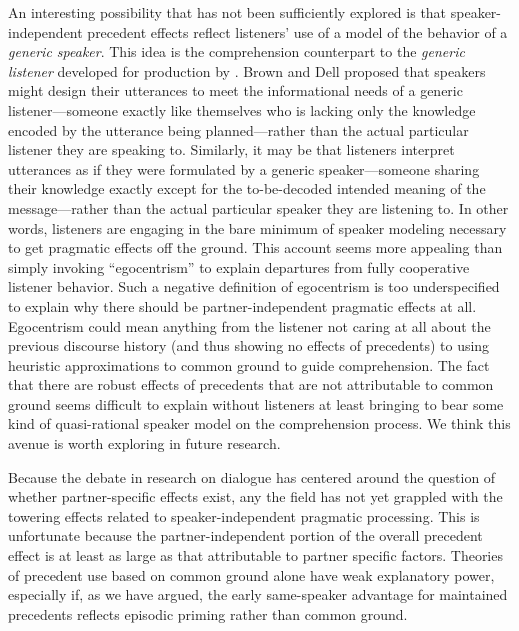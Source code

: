 \documentclass[doc,fignum,apacite,floatsintext]{apa6}
\begin{document}
An interesting possibility that has not been sufficiently explored is that speaker-independent precedent effects reflect listeners' use of a model of the behavior of a \textit{generic speaker}.  This idea is the comprehension counterpart to the \textit{generic listener} developed for production by .  Brown and Dell proposed that speakers might design their utterances to meet the informational needs of a generic listener---someone exactly like themselves who is lacking only the knowledge encoded by the utterance being planned---rather than the actual particular listener they are speaking to.  Similarly, it may be that listeners interpret utterances as if they were formulated by a generic speaker---someone sharing their knowledge exactly except for the to-be-decoded intended meaning of the message---rather than the actual particular speaker they are listening to.  In other words, listeners are engaging in the bare minimum of speaker modeling necessary to get pragmatic effects off the ground.  This account seems more appealing than simply invoking ``egocentrism'' to explain departures from fully cooperative listener behavior.  Such a negative definition of egocentrism is too underspecified to explain why there should be partner-independent pragmatic effects at all.  Egocentrism could mean anything from the listener not caring at all about the previous discourse history (and thus showing no effects of precedents) to using heuristic approximations to common ground to guide comprehension.  The fact that there are robust effects of precedents that are not attributable to common ground seems difficult to explain without listeners at least bringing to bear some kind of quasi-rational speaker model on the comprehension process.  We think this avenue is worth exploring in future research.

Because the debate in research on dialogue has centered around the question of whether partner-specific effects exist, any the field has not yet grappled with the towering effects related to speaker-independent pragmatic processing.  This is unfortunate because the partner-independent portion of the overall precedent effect is at least as large as that attributable to partner specific factors.  Theories of precedent use based on common ground alone have weak explanatory power, especially if, as we have argued, the early same-speaker advantage for maintained precedents reflects episodic priming rather than common ground.
\end{document}
